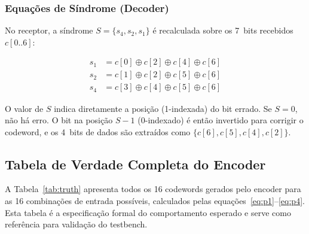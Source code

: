 \documentclass[12pt,a4paper]{article}
\begin{document}
\subsubsection{Equações de Síndrome (Decoder)}

No receptor, a síndrome $S = \{s_4, s_2, s_1\}$ é recalculada sobre os 7~bits recebidos $c[0..6]$:

\begin{align}
  s_1 &= c[0] \oplus c[2] \oplus c[4] \oplus c[6] \label{eq:s1}\\
  s_2 &= c[1] \oplus c[2] \oplus c[5] \oplus c[6] \label{eq:s2}\\
  s_4 &= c[3] \oplus c[4] \oplus c[5] \oplus c[6] \label{eq:s4}
\end{align}

O valor de $S$ indica diretamente a posição (1-indexada) do bit errado. Se $S=0$, não há erro. O bit na posição $S-1$ (0-indexado) é então invertido para corrigir o codeword, e os 4~bits de dados são extraídos como $\{c[6], c[5], c[4], c[2]\}$.

\subsection{Tabela de Verdade Completa do Encoder}

A Tabela~\ref{tab:truth} apresenta todos os 16 codewords gerados pelo encoder para as 16 combinações de entrada possíveis, calculados pelas equações~\eqref{eq:p1}--\eqref{eq:p4}. Esta tabela é a especificação formal do comportamento esperado e serve como referência para validação do testbench.
\end{document}
